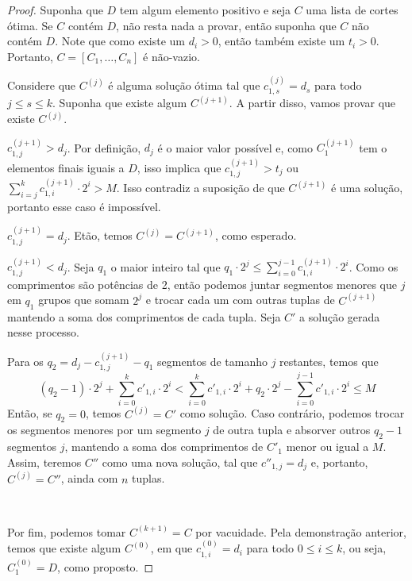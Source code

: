 \begin{proof}
    Suponha que $D$ tem algum elemento positivo e seja $C$ uma lista de cortes ótima. Se $C$ contém $D$, não resta nada a provar, então suponha que $C$ não contém $D$. Note que como existe um $d_i > 0$, então também existe um $t_i > 0$. Portanto, $C = [C_1, \ldots, C_n]$ é não-vazio.

    Considere que $C^{(j)}$ é alguma solução ótima tal que $c^{(j)}_{1, s} = d_s$ para todo $j \leq s \leq k$. Suponha que existe algum $C^{(j + 1)}$. A partir disso, vamos provar que existe $C^{(j)}$.

    \begin{casos}
        \item $c^{(j + 1)}_{1, j} > d_j$. Por definição, $d_j$ é o maior valor possível e, como $C^{(j + 1)}_1$ tem o elementos finais iguais a $D$, isso implica que $c^{(j + 1)}_{1, j} > t_j$ ou $\sum_{i = j}^k c^{(j + 1)}_{1, i} \cdot 2^i > M$. Isso contradiz a suposição de que $C^{(j + 1)}$ é uma solução, portanto esse caso é impossível.

        \item $c^{(j + 1)}_{1, j} = d_j$. Etão, temos $C^{(j)} = C^{(j + 1)}$, como esperado.

        \item $c^{(j + 1)}_{1, j} < d_j$. Seja $q_1$ o maior inteiro tal que $q_1 \cdot 2^j \leq \sum_{i = 0}^{j - 1} c^{(j + 1)}_{1, i} \cdot 2^i$. Como os comprimentos são potências de 2, então podemos juntar segmentos menores que $j$ em $q_1$ grupos que somam $2^j$ e trocar cada um com outras tuplas de $C^{(j + 1)}$ mantendo a soma dos comprimentos de cada tupla. Seja $C'$ a solução gerada nesse processo.

        Para os $q_2 = d_j - c^{(j + 1)}_{1, j} - q_1$ segmentos de tamanho $j$ restantes, temos que \[
            (q_2 - 1) \cdot 2^j + \sum_{i = 0}^k c'_{1, i} \cdot 2^i < \sum_{i = 0}^k c'_{1, i} \cdot 2^i + q_2 \cdot 2^j - \sum_{i = 0}^{j - 1} c'_{1, i} \cdot 2^i \leq M
        \]
        Então, se $q_2 = 0$, temos $C^{(j)} = C'$ como solução. Caso contrário, podemos trocar os segmentos menores por um segmento $j$ de outra tupla e absorver outros $q_2 - 1$ segmentos $j$, mantendo a soma dos comprimentos de $C'_1$ menor ou igual a $M$. Assim, teremos $C''$ como uma nova solução, tal que $c''_{1, j} = d_j$ e, portanto, $C^{(j)} = C''$, ainda com $n$ tuplas.
    \end{casos}

    ~

    Por fim, podemos tomar $C^{(k + 1)} = C$ por vacuidade. Pela demonstração anterior, temos que existe algum $C^{(0)}$, em que $c^{(0)}_{1,i} = d_i$ para todo $0 \leq i \leq k$, ou seja, $C^{(0)}_1 = D$, como proposto.
\end{proof}

